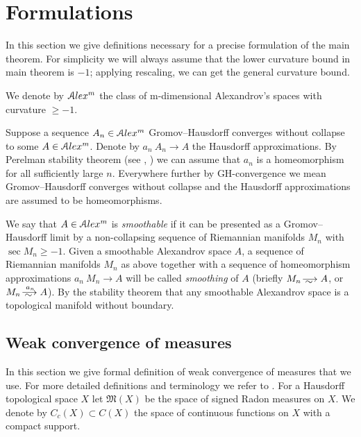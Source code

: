 \section{Formulations}

In this section we give definitions necessary for a precise formulation 
of the main theorem.
For simplicity  we will always assume that the lower
curvature bound in main theorem is  $-1$;
applying rescaling, we can get the general curvature bound.

We denote by
$\mathcal{A}lex^m$ the class of m-dimensional Alexandrov's spaces
with curvature $\ge -1$.

Suppose a sequence $A_n\in \mathcal{A}lex^m$ Gromov--Hausdorff converges without collapse to some
$A\in \mathcal{A}lex^m$.
Denote by $a_n\:A_n\to A$ the Hausdorff approximations.
By Perelman stability theorem (see \cite{PerStab}, \cite{KapStab}) we can assume that $a_n$ is a homeomorphism for all sufficiently large $n$.
Everywhere further by GH-convergence we mean 
Gromov--Hausdorff converges without collapse and the Hausdorff approximations are assumed to be homeomorphisms.


We say that $A\in \mathcal{A}lex^m$ is \emph{smoothable}
if it can be presented as a Gromov--Hausdorff limit by a non-collapsing sequence of Riemannian manifolds $M_n$ with $\sec M_n\ge-1$.
Given a smoothable Alexandrov space $A$,
a sequence of Riemannian manifolds $M_n$ as above
together with a sequence of homeomorphism approximations $a_n\:M_n\to A$
will be called \emph{smoothing} of $A$
(briefly $M_n\smooths{} A$, or $M_n\smooths{a_n} A$).
By the stability theorem that any smoothable Alexandrov space is a topological manifold without boundary.






 
 
 
\subsection{Weak convergence of measures}

In this section we give formal definition of weak convergence of measures
that we use.
For more detailed definitions and terminology we refer to
\cite{GMS}.
For a Hausdorff topological space $X$ let
$\mathfrak M(X)$ be the space of signed Radon measures on $X$.
We denote by $C_c(X)\subset C(X)$  the space of continuous functions on $X$
with a compact support. 

